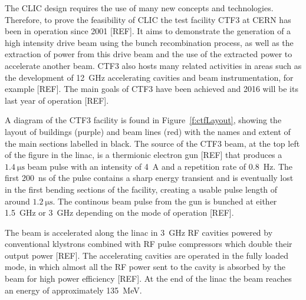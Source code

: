 
The CLIC design requires the use of many new concepts and technologies. Therefore, to prove the feasibility of CLIC the test facility CTF3 at CERN has been in operation since 2001 [REF]. It aims to demonstrate the generation of a high intensity drive beam using the bunch recombination process, as well as the extraction of power from this drive beam and the use of the extracted power to accelerate another beam. CTF3 also hosts many related activities in areas such as the development of 12~GHz accelerating cavities and beam instrumentation, for example [REF]. The main goals of CTF3 have been achieved and 2016 will be its last year of operation [REF].

A diagram of the CTF3 facility is found in Figure~\ref{f:ctfLayout},  showing the layout of buildings (purple) and beam lines (red) with the names and extent of the main sections labelled in black. The source of the CTF3 beam, at the top left of the figure in the linac, is a thermionic electron gun [REF] that produces a \(1.4~\mathrm{\mu s}\) beam pulse with an intensity of 4~A and a repetition rate of 0.8~Hz. The first 200~ns of the pulse contains a sharp energy transient and is eventually lost in the first bending sections of the facility, creating a usable pulse length of around \(1.2~\mathrm{\mu s}\). The continous beam pulse from the gun is bunched at either 1.5~GHz or 3~GHz depending on the mode of operation [REF].


The beam is accelerated along the linac in 3~GHz RF cavities powered by conventional klystrons combined with RF pulse compressors which double their output power [REF]. The accelerating cavities are operated in the fully loaded mode, in which almost all the RF power sent to the cavity is absorbed by the beam for high power efficiency [REF]. At the end of the linac the beam reaches an energy of approximately 135~MeV.

